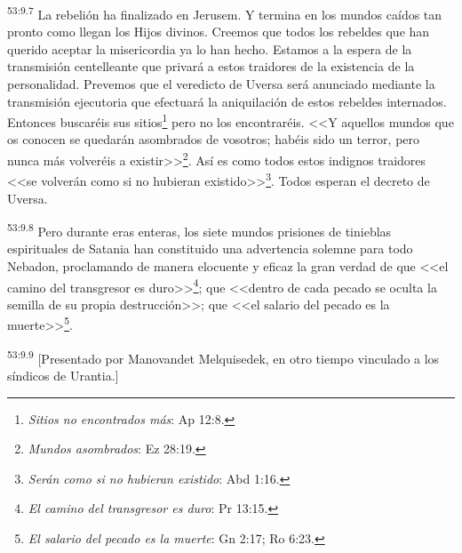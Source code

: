 \par
\textsuperscript{53:9.7} La rebelión ha finalizado en Jerusem. Y termina en los mundos caídos tan pronto como llegan los Hijos divinos. Creemos que todos los rebeldes que han querido aceptar la misericordia ya lo han hecho. Estamos a la espera de la transmisión centelleante que privará a estos traidores de la existencia de la personalidad. Prevemos que el veredicto de Uversa será anunciado mediante la transmisión ejecutoria que efectuará la aniquilación de estos rebeldes internados. Entonces buscaréis sus sitios\footnote{\textit{Sitios no encontrados más}: Ap 12:8.} pero no los encontraréis. <<Y aquellos mundos que os conocen se quedarán asombrados de vosotros; habéis sido un terror, pero nunca más volveréis a existir>>\footnote{\textit{Mundos asombrados}: Ez 28:19.}. Así es como todos estos indignos traidores <<se volverán como si no hubieran existido>>\footnote{\textit{Serán como si no hubieran existido}: Abd 1:16.}. Todos esperan el decreto de Uversa.

\par
\textsuperscript{53:9.8} Pero durante eras enteras, los siete mundos prisiones de tinieblas espirituales de Satania han constituido una advertencia solemne para todo Nebadon, proclamando de manera elocuente y eficaz la gran verdad de que <<el camino del transgresor es duro>>\footnote{\textit{El camino del transgresor es duro}: Pr 13:15.}; que <<dentro de cada pecado se oculta la semilla de su propia destrucción>>; que <<el salario del pecado es la muerte>>\footnote{\textit{El salario del pecado es la muerte}: Gn 2:17; Ro 6:23.}.

\par
\textsuperscript{53:9.9} [Presentado por Manovandet Melquisedek, en otro tiempo vinculado a los síndicos de Urantia.]